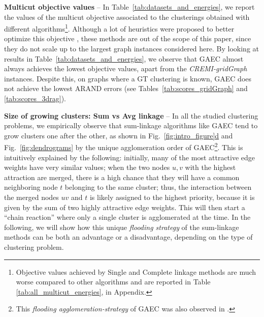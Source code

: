 \textbf{Multicut objective values} -- In Table~\ref{tab:datasets_and_energies}, we report the values of the multicut objective associated to the clusterings obtained with different \algname{} algorithms\footnote{Objective values achieved by Single and Complete linkage methods are much worse compared to other algorithms and are reported in Table \ref{tab:all_multicut_energies}, in Appendix.}. Although a lot of heuristics were proposed to better optimize this objective \cite{beier2016efficient,beier2014cut,kernighan1970efficient}, these methods are out of the scope of this paper, since they do not scale up to the largest graph instances considered here. By looking at results in Table~\ref{tab:datasets_and_energies}, we observe that GAEC almost always achieves the lowest objective values, apart from the \emph{CREMI-gridGraph} instances. Despite this, on graphs where a GT clustering is known, GAEC does not achieve the lowest ARAND errors (see Tables~\ref{tab:scores_gridGraph} and \ref{tab:scores_3drag}). 

\textbf{Size of growing clusters: Sum vs Avg linkage} --
In all the studied clustering problems, we empirically observe that sum-linkage algorithms like GAEC tend to grow clusters one after the other, as shown in Fig.~\hyperref[fig:intro_figure]{\ref*{fig:intro_figure}d} and Fig.~\ref{fig:dendrograms} by the unique agglomeration order of GAEC\footnote{This \emph{flooding agglomeration-strategy} of GAEC was also observed in \cite{kardoostsolving}.}. This is intuitively explained by the  following: initially, many of the most attractive edge weights have very similar values; when the two nodes $u,v$ with the highest attraction are merged, there is a high chance that they will have a common neighboring node $t$ belonging to the same cluster; thus, the interaction between the merged nodes $uv$ and $t$ is likely assigned to the highest priority, because it is given by the sum of two highly attractive edge weights. This will then start a ``chain reaction'' where only a single cluster is agglomerated at the time. 
In the following, we will show how this unique \emph{flooding strategy} of the sum-linkage methods can be both an advantage or a disadvantage, depending on the type of clustering problem. 

